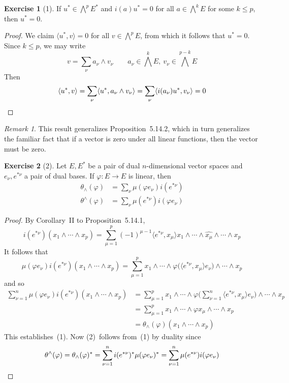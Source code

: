 \documentclass[letterpaper,12pt]{article}
\newcommand{\eprod}{\wedge}
\newcommand{\bigeprod}{\bigwedge}
\newcommand{\medeprod}{{\textstyle\bigeprod}}
\newcommand{\delete}{\widehat}
\newcommand{\sprod}[2]{\langle#1,#2\rangle}
\newcommand{\multi}[4]{#2_{#3}#1\cdots#1#2_{#4}}
\newcommand{\eprods}[3]{\multi{\eprod}{#1}{#2}{#3}}
\theoremstyle{definition}
\newtheorem*{exer}{Exercise}
\theoremstyle{remark}
\newtheorem*{rmk}{Remark}
\begin{document}
\begin{exer}[1]
If \(u^*\in\medeprod^p E^*\) and \(i(a)u^*=0\) for all \(a\in\medeprod^k E\) for some \(k\le p\), then \(u^*=0\).
\end{exer}
\begin{proof}
We claim \(\sprod{u^*}{v}=0\) for all \(v\in\medeprod^p E\), from which it follows that \(u^*=0\). Since \(k\le p\), we may write
\[v=\sum_{\nu}a_{\nu}\eprod v_{\nu}\qquad a_{\nu}\in\medeprod^k E,\ v_{\nu}\in\medeprod^{p-k}E\]
Then
\[\sprod{u^*}{v}=\sum_{\nu}\sprod{u^*}{a_{\nu}\eprod v_{\nu}}=\sum_{\nu}\sprod{i(a_{\nu})u^*}{v_{\nu}}=0\qedhere\]
\end{proof}
\begin{rmk}
This result generalizes Proposition~5.14.2, which in turn generalizes the familiar fact that if a vector is zero under all linear functions, then the vector must be zero.
\end{rmk}

\begin{exer}[2]
Let \(E,E^*\) be a pair of dual \(n\)-dimensional vector spaces and \(e_{\nu},e^{*\nu}\) a pair of dual bases. If \(\varphi:E\to E\) is linear, then
\begin{align*}
\theta_{\eprod}(\varphi)&=\sum_{\nu}\mu(\varphi e_{\nu})i(e^{*\nu})\tag{1}\\
\theta^{\eprod}(\varphi)&=\sum_{\nu}\mu(e^{*\nu})i(\varphi e_{\nu})\tag{2}
\end{align*}
\end{exer}
\begin{proof}
By Corollary~II to Proposition~5.14.1,
\[i(e^{*\nu})(\eprods{x}{1}{p})=\sum_{\mu=1}^p(-1)^{\mu-1}\sprod{e^{*\nu}}{x_{\mu}}x_1\eprod\cdots\eprod\delete{x_{\mu}}\eprod\cdots\eprod x_p\]
It follows that
\[\mu(\varphi e_{\nu})i(e^{*\nu})(\eprods{x}{1}{p})=\sum_{\mu=1}^p x_1\eprod\cdots\eprod\varphi\bigl(\sprod{e^{*\nu}}{x_{\mu}}e_{\nu}\bigr)\eprod\cdots\eprod x_p\]
and so
\begin{align*}
\sum_{\nu=1}^n\mu(\varphi e_{\nu})i(e^{*\nu})(\eprods{x}{1}{p})&=\sum_{\mu=1}^p x_1\eprod\cdots\eprod\varphi\bigl(\sum_{\nu=1}^n\sprod{e^{*\nu}}{x_{\mu}}e_{\nu}\bigr)\eprod\cdots\eprod x_p\\
	&=\sum_{\mu=1}^p x_1\eprod\cdots\eprod\varphi x_{\mu}\eprod\cdots\eprod x_p\\
	&=\theta_{\eprod}(\varphi)(\eprods{x}{1}{p})
\end{align*}
This establishes~(1). Now (2)~follows from~(1) by duality since
\[\theta^{\eprod}(\varphi)=\theta_{\eprod}(\varphi)^*=\sum_{\nu=1}^n i(e^{*\nu})^*\mu(\varphi e_{\nu})^*=\sum_{\nu=1}^n\mu(e^{*\nu})i(\varphi e_{\nu})\qedhere\]
\end{proof}
\end{document}
